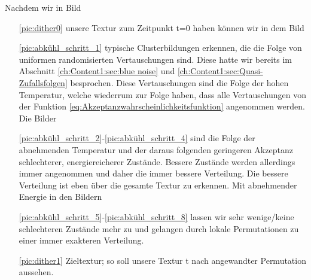   Nachdem wir in Bild 
  \begin{itemize}
    \item[\ref{pic:dither0}] unsere  Textur zum Zeitpunkt t=0 
                              haben können wir in dem Bild
    \item[\ref{pic:abkühl_schritt_1}] typische Clusterbildungen erkennen, die die Folge von 
                                    uniformen randomisierten Vertauschungen sind. Diese hatte wir bereits 
                                    im Abschnitt \ref{ch:Content1:sec:blue noise} und \ref{ch:Content1:sec:Quasi-Zufallsfolgen}
                                    besprochen. Diese Vertauschungen sind die Folge der hohen Temperatur, welche wiederrum zur Folge haben, 
                                    dass alle Vertauschungen von der Funktion \ref{eq:Akzeptanzwahrscheinlichkeitsfunktion} angenommen werden. 
                                    Die Bilder  
    \item[\ref{pic:abkühl_schritt_2}-\ref{pic:abkühl_schritt_4}] sind die Folge der abnehmenden Temperatur und der daraus folgenden geringeren 
                                    Akzeptanz schlechterer, energiereicherer Zustände. Bessere Zustände werden allerdings immer angenommen und 
                                    daher die immer bessere  Verteilung. Die bessere Verteilung ist eben über 
                                    die gesamte Textur zu erkennen. Mit abnehmender Energie in den Bildern   
    \item[\ref{pic:abkühl_schritt_5}-\ref{pic:abkühl_schritt_8}] lassen wir sehr wenige/keine schlechteren Zustände mehr zu und gelangen durch 
                                    lokale Permutationen zu einer immer exakteren Verteilung.  
    \item[\ref{pic:dither1}] Zieltextur; so soll unsere Textur t nach angewandter 
                              Permutation aussehen. 
  \end{itemize}





